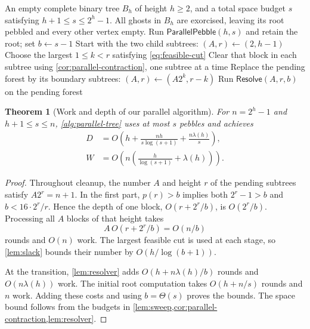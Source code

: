 \documentclass[11pt]{article}
\newtheorem{theorem}{Theorem}[section]
\theoremstyle{definition}
\theoremstyle{remark}
\newcommand{\Sweep}{\mathsf{ParallelPebble}}
\newcommand{\Resolve}{\mathsf{Resolve}}
\begin{document}
\begin{algorithm}[H]
\caption{Parallel spooky pebbling on complete binary trees}
\label{alg:parallel-tree}
\begin{algorithmic}[1]
\Require An empty complete binary tree $B_h$ of height $h\ge2$, and a total space budget $s$ satisfying $h+1\le s\le2^h-1$.
\Ensure All ghosts in $B_h$ are exorcised, leaving its root pebbled and every other vertex empty.
\State Run $\Sweep(h,s)$ and retain the root; set $b\gets s-1$
\State Start with the two child subtrees: $(A,r)\gets(2,h-1)$
 \State Choose the largest $1\le k<r$ satisfying \cref{eq:feasible-cut}
 \State Clear that block in each subtree using \cref{cor:parallel-contraction}, one subtree at a time
 \State Replace the pending forest by its boundary subtrees: $(A,r)\gets(A2^k,r-k)$
\EndWhile
\State Run $\Resolve(A,r,b)$ on the pending forest
\end{algorithmic}
\end{algorithm}

\begin{theorem}[Work and depth of our parallel algorithm]
\label{thm:parallel-upper}
For $n=2^h-1$ and $h+1\le s\le n$, \cref{alg:parallel-tree} uses at most $s$ pebbles and achieves
\begin{align}
D&=O\!\left(h+\frac{nh}{s\log(s+1)}+\frac{n\lambda(h)}s\right), \label{eq:depth-upper}\\
W&=O\!\left(n\left(\frac h{\log(s+1)}+\lambda(h)\right)\right). \label{eq:depth-schedule-work}
\end{align}
\end{theorem}
\begin{proof}
Throughout cleanup, the number $A$ and height $r$ of the pending subtrees satisfy $A2^r=n+1$. In the first part, $p(r)>b$ implies both $2^r-1>b$ and $b<16\cdot2^r/r$. Hence the depth of one block, $O(r+2^r/b)$, is $O(2^r/b)$. Processing all $A$ blocks of that height takes
\[
A\,O(r+2^r/b)=O(n/b)
\]
rounds and $O(n)$ work. The largest feasible cut is used at each stage, so \cref{lem:slack} bounds their number by $O(h/\log(b+1))$.

At the transition, \cref{lem:resolver} adds $O(h+n\lambda(h)/b)$ rounds and $O(n\lambda(h))$ work. The initial root computation takes $O(h+n/s)$ rounds and $n$ work. Adding these costs and using $b=\Theta(s)$ proves the bounds. The space bound follows from the budgets in \cref{lem:sweep,cor:parallel-contraction,lem:resolver}.
\end{proof}
\end{document}
